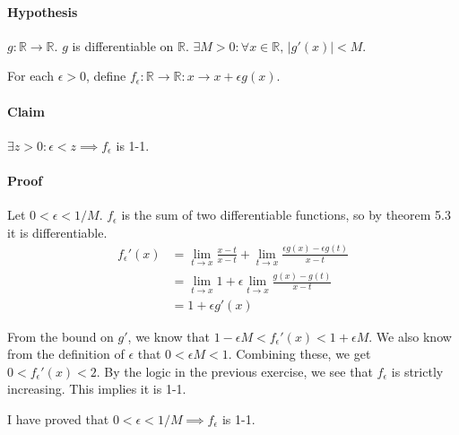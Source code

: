 \documentclass[11pt,letterpaper]{article}
\begin{document}
\paragraph{Hypothesis} $g: \mathbb{R} \rightarrow \mathbb{R}$. $g$ is differentiable on $\mathbb{R}$. $\exists M>0 : \forall x \in \mathbb{R},\, |g'(x)| < M$. 

For each $\epsilon>0$, define $f_\epsilon : \mathbb{R} \rightarrow \mathbb{R} : x \rightarrow x + \epsilon g(x)$.
\paragraph{Claim} $\exists z>0 : \epsilon < z \implies f_\epsilon$ is 1-1. 
\paragraph{Proof} Let $0 < \epsilon < 1/M$. $f_\epsilon$ is the sum of two differentiable functions, so by theorem 5.3 it is differentiable.
\begin{align*}
f_\epsilon'(x) &= \lim_{t \rightarrow x}\frac{x-t}{x-t} + \lim_{t \rightarrow x}\frac{\epsilon g(x)-\epsilon g(t)}{x-t} \\
&= \lim_{t \rightarrow x}1 + \epsilon\lim_{t \rightarrow x}\frac{g(x)-g(t)}{x-t} \\
&= 1 + \epsilon g'(x)
\end{align*}

From the bound on $g'$, we know that $1-\epsilon M < f_\epsilon'(x) < 1+\epsilon M$. We also know from the definition of $\epsilon$ that $0 <\epsilon M < 1$. Combining these, we get $0 < f_\epsilon'(x) < 2$. By the logic in the previous exercise, we see that $f_\epsilon$ is strictly increasing. This implies it is 1-1. 

I have proved that $0 < \epsilon < 1/M \implies f_\epsilon$ is 1-1.
\end{document}
